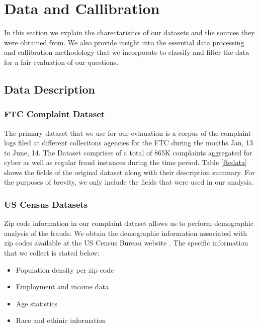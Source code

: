 \documentclass[conference]{IEEEtran}
\begin{document}
\section{Data and Callibration}

In this section we explain the charectarisitcs of our datasets and the sources they were obtained from. We also provide insight into the essential data processing and callibration methodology that we incorporate to classify and filter the data for a fair evaluation of our questions.

\subsection{Data Description}

\subsubsection{FTC Complaint Dataset}

The primary dataset that we use for our evlauation is a corpus of the complaint logs filed at different collecitons agencies for the FTC during the months Jan, 13 to June, 14. The Dataset comprises of a total of 865K complaints aggregated for cyber as well as regular fraud instances during the time period. Table \ref{ftcdata} shows the fields of the original dataset along with their description summary. For the purposes of brevity, we only include the fields that were used in our analysis.
\\
\subsubsection{US Census Datasets}
Zip code information in our complaint dataset allows us to perform demographic analysis of the frauds. We obtain the demographic information associated with zip codes available at the US Census Bureau website \cite{usbureau}. The specific information that we collect is stated below:

\begin{itemize}
\vspace{8pt}
  \item Population density per zip code
  \item Employment and income data
  \item Age statistics
  \item Race and ethinic information
  \vspace{8pt}
\end{itemize}
\end{document}
